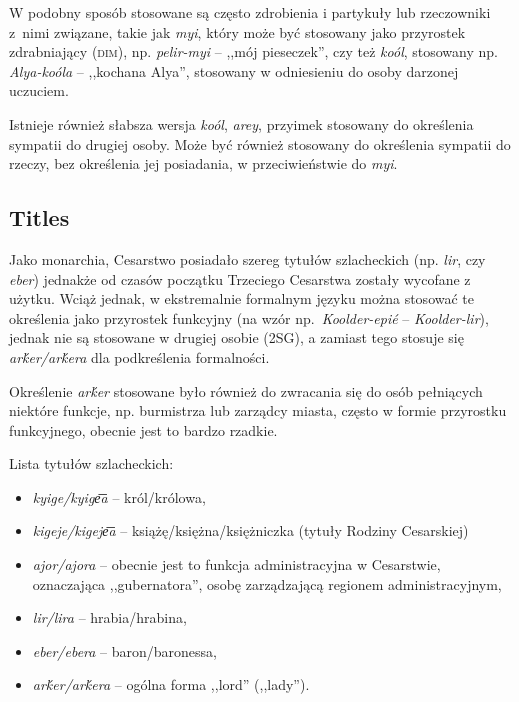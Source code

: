 W podobny sposób stosowane są często zdrobienia i partykuły lub rzeczowniki
z~nimi związane, takie jak \emph{myi}, który może być stosowany jako przyrostek
zdrabniający (\textsc{dim}), np. \emph{pelir-myi} -- ,,mój pieseczek'', czy też
\emph{koól}, stosowany np. \emph{Alya-koóla} -- ,,kochana Alya'', stosowany w
odniesieniu do osoby darzonej uczuciem.

Istnieje również słabsza wersja \emph{koól}, \emph{arey}, przyimek stosowany do
określenia sympatii do drugiej osoby. Może być również stosowany do określenia
sympatii do rzeczy, bez określenia jej posiadania, w przeciwieństwie do
\emph{myi}.

\subsection{Titles}

Jako monarchia, Cesarstwo posiadało szereg tytułów szlacheckich (np. \emph{lir},
czy \emph{eber}) jednakże od czasów początku Trzeciego Cesarstwa zostały
wycofane z użytku. Wciąż jednak, w ekstremalnie formalnym języku można stosować
te określenia jako przyrostek funkcyjny (na wzór np.~\emph{Koolder-epié} --
\emph{Koolder-lir}), jednak nie są stosowane w drugiej osobie (\textsc{2SG}), a
zamiast tego stosuje się \emph{arḱer/arḱera} dla podkreślenia formalności.



Określenie \emph{arḱer} stosowane było również do zwracania się do osób
pełniących niektóre funkcje, np. burmistrza lub zarządcy miasta, często w formie
przyrostku funkcyjnego, obecnie jest to bardzo rzadkie.

Lista tytułów szlacheckich:

\begin{itemize}
    \item \emph{kyige/kyige͞a} -- król/królowa,
    \item \emph{kigeje/kigeje͞a} -- książę/księżna/księżniczka (tytuły Rodziny
          Cesarskiej)
    \item \emph{ajor/ajora} -- obecnie jest to funkcja administracyjna w
          Cesarstwie, oznaczająca ,,gubernatora'', osobę zarządzającą regionem
          administracyjnym,
    \item \emph{lir/lira} -- hrabia/hrabina,
    \item \emph{eber/ebera} -- baron/baronessa,
    \item \emph{arḱer/arḱera} -- ogólna forma ,,lord'' (,,lady'').
\end{itemize}

